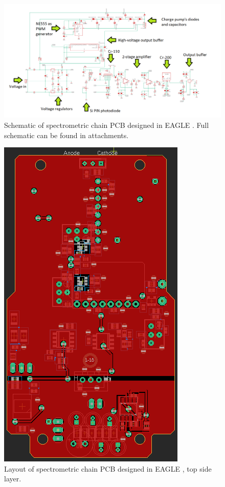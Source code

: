 \begin{figure}[H]
 \centering
 \includegraphics[scale=0.5, angle = 90]{./pictures/schemaPopis.png}
 \caption{Schematic of spectrometric chain PCB designed in EAGLE \cite{eagle}. Full schematic can be found in attachments.}
 \label{schematic}
 
\end{figure}

\newpage

\begin{figure}[H]
 \centering
 \includegraphics[scale=0.8, angle = 90]{./pictures/S14topLay.png}
 \caption{Layout of spectrometric chain PCB designed in EAGLE \cite{eagle}, top side layer.}
 \label{layout top}
 
\end{figure}

